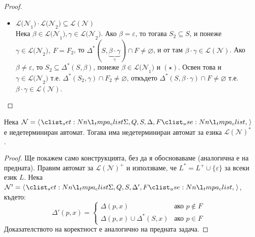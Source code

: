 \begin{proof}
\begin{itemize}
        \item $\mathcal{L(N}_1) \cdot \mathcal{L(N}_2) \subseteq \mathcal{L(N)}$ \\
              Нека $\beta \in \mathcal{L(N}_1), \gamma \in \mathcal{L(N}_2)$.
              Ако $\beta = \varepsilon$, то тогава $S_2 \subseteq S$, и понеже $\gamma \in \mathcal{L(N}_2), \: F = F_2$,
              то $\Delta^*(S, \underbrace{\beta \cdot \gamma}_{\gamma}) \cap F \neq \varnothing$, и от там $\beta \cdot \gamma \in \mathcal{L(N)}$.
              Ако $\beta \neq \varepsilon$, то $S_2 \subseteq \Delta^*(S, \beta)$, понеже $\beta \in \mathcal{L(N}_1)$ и $(\star)$.
              Освен това и $\gamma \in \mathcal{L(N}_2)$ т.е. $\Delta^*(S_2, \gamma) \cap F_2 \neq \varnothing$,
              откъдето $\Delta^*(S, \beta \cdot \gamma) \cap F \neq \varnothing$ т.е. $\beta \cdot \gamma \in \mathcal{L(N)}$.
    \end{itemize}
\end{proof}

\begin{claim}
    Нека $\mathcal{N} = \opair{\Sigma, Q, S, \Delta, F}$ е недетерминиран автомат.
    Тогава има недетерминиран автомат за езика $\mathcal{L(N)^*}$.
\end{claim}

\begin{proof}
    Ще покажем само конструкцията, без да я обосноваваме (аналогична е на предната).
    Правим автомат за $\mathcal{L(N)^+}$ и използваме, че $L^* = L^+ \cup \{ \varepsilon \}$ за всеки език $L$.
    Нека $\mathcal{N}' = \opair{\Sigma, Q, S, \Delta', F}$, където:
    \begin{equation}
        \Delta'(p, x) =
        \begin{cases}
            \Delta(p, x)                     & \text{ако } p \notin F \\
            \Delta(p, x) \cup \Delta^*(S, x) & \text{ако } p \in F
        \end{cases}
    \end{equation}
    Доказателството на коректност е аналогично на предната задача.
\end{proof}